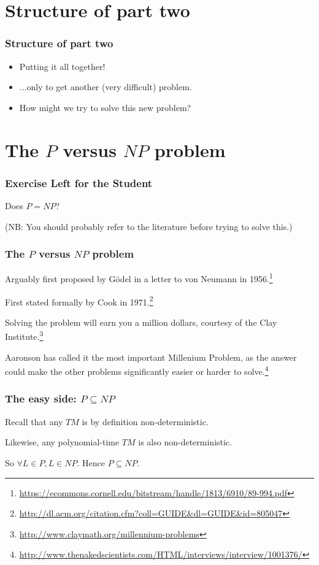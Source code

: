 \documentclass[aspectratio=169]{beamer}
\begin{document}
\section{Structure of part two}

\begin{frame}
\frametitle{Structure of part two}
\begin{itemize}
    \item Putting it all together!
    \item ...only to get another (very difficult) problem.
    \item How might we try to solve this new problem?
\end{itemize}
\end{frame}

\section{The $P$ versus $NP$ problem}

\begin{frame}
\frametitle{Exercise Left for the Student}
\centerline{Does $P=NP$?}

(NB: You should probably refer to the literature before trying to solve this.)
\end{frame}

\begin{frame}
\frametitle{The $P$ versus $NP$ problem}
Arguably first proposed by G\"{o}del in a letter to von Neumann in 1956.\footnote{\url{https://ecommons.cornell.edu/bitstream/handle/1813/6910/89-994.pdf}}

First stated formally by Cook in 1971.\footnote{\url{http://dl.acm.org/citation.cfm?coll=GUIDE&dl=GUIDE&id=805047}}

Solving the problem will earn you a million dollars, courtesy of the Clay Institute.\footnote{\url{http://www.claymath.org/millennium-problems}}

Aaronson has called it the most important Millenium Problem, as the answer could make the other problems significantly easier or harder to solve.\footnote{\url{http://www.thenakedscientists.com/HTML/interviews/interview/1001376/}}
\end{frame}

\begin{frame}
\frametitle{The easy side: $P \subseteq NP$}

Recall that any $TM$ is by definition non-deterministic.

Likewise, any polynomial-time $TM$ is also non-deterministic.

So $\forall L \in P, L \in NP$. Hence $P \subseteq NP$.
\end{frame}
\end{document}
